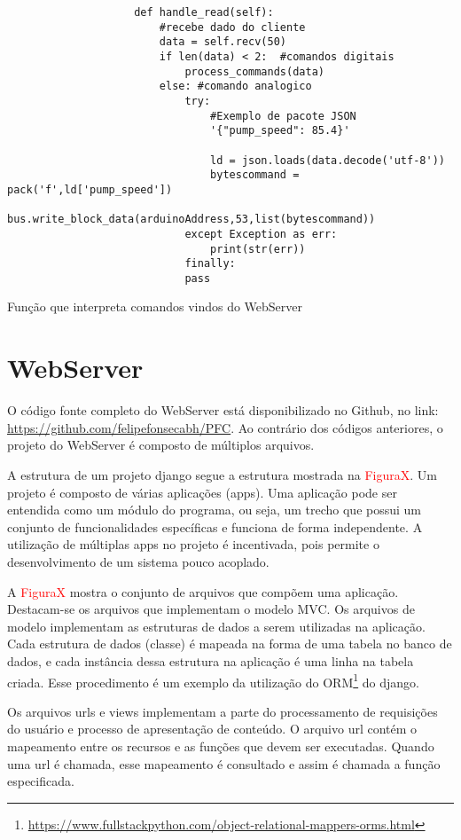 				\begin{listing}[!htb]
					\begin{verbatim}
					def handle_read(self):
						#recebe dado do cliente
						data = self.recv(50)
						if len(data) < 2:  #comandos digitais
							process_commands(data)
						else: #comando analogico
							try:
								#Exemplo de pacote JSON
								'{"pump_speed": 85.4}'
								
								ld = json.loads(data.decode('utf-8'))
								bytescommand = pack('f',ld['pump_speed'])
								bus.write_block_data(arduinoAddress,53,list(bytescommand))
							except Exception as err:
								print(str(err))
							finally:
							pass
					\end{verbatim}
					\caption{Função que interpreta comandos vindos do WebServer}
					\label{cod:handle_read}
				\end{listing}
			
			\section{WebServer}
				O código fonte completo do WebServer está disponibilizado no Github, no link: \url{https://github.com/felipefonsecabh/PFC}. Ao contrário dos códigos anteriores, o projeto do WebServer é composto de múltiplos arquivos.
				
				A estrutura de um projeto django segue a estrutura mostrada na \textcolor{red}{FiguraX}. Um projeto é composto de várias aplicações (apps). Uma aplicação pode ser entendida como um módulo do programa, ou seja, um trecho que possui um conjunto de funcionalidades específicas e funciona de forma independente. A utilização de múltiplas apps no projeto é incentivada, pois permite o desenvolvimento de um sistema pouco acoplado.
				
				A \textcolor{red}{FiguraX} mostra o conjunto de arquivos que compõem uma aplicação. Destacam-se os arquivos que implementam o modelo MVC. Os arquivos de modelo implementam as estruturas de dados a serem utilizadas na aplicação. Cada estrutura de dados (classe) é mapeada na forma de uma tabela no banco de dados, e cada instância dessa estrutura na aplicação é uma linha na tabela criada. Esse procedimento é um exemplo da utilização do ORM\footnote{\url{https://www.fullstackpython.com/object-relational-mappers-orms.html}} do django.
				
				Os arquivos urls e views implementam a parte do processamento de requisições do usuário e processo de apresentação de conteúdo. O arquivo url contém o mapeamento entre os recursos e as funções que devem ser executadas. Quando uma url é chamada, esse mapeamento é consultado e assim é chamada a função especificada.
				
